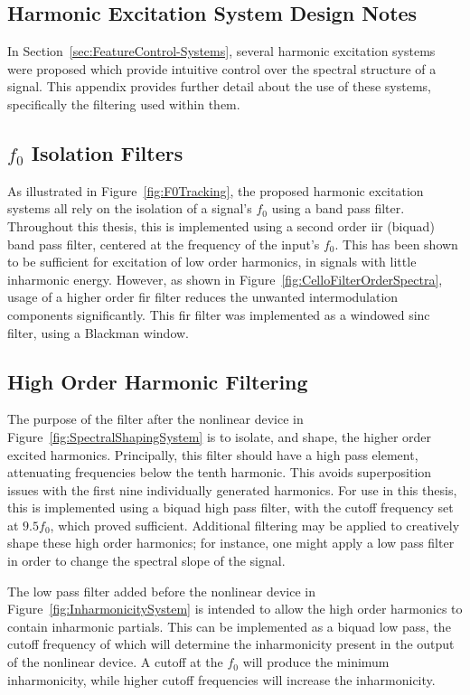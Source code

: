 \begin{appendices}
\chapter{Harmonic Excitation System Design Notes}
\label{app:FilterNotes}
	In Section~\ref{sec:FeatureControl-Systems}, several harmonic excitation systems were proposed which provide
	intuitive control over the spectral structure of a signal. This appendix provides further detail about the use of
	these systems, specifically the filtering used within them.

	\section{$f_{0}$ Isolation Filters}
		As illustrated in Figure~\ref{fig:F0Tracking}, the proposed harmonic excitation systems all rely on the
		isolation of a signal's $f_{0}$ using a band pass filter. Throughout this thesis, this is implemented using
		a second order \acrshort{iir} (biquad) band pass filter, centered at the frequency of the input's $f_{0}$.
		This has been shown to be sufficient for excitation of low order harmonics, in signals with little
		inharmonic energy.  However, as shown in Figure~\ref{fig:CelloFilterOrderSpectra}, usage of a higher order
		\acrshort{fir} filter reduces the unwanted intermodulation components significantly. This \acrshort{fir}
		filter was implemented as a windowed sinc filter, using a Blackman window.

	\section{High Order Harmonic Filtering}
		The purpose of the filter after the nonlinear device in Figure~\ref{fig:SpectralShapingSystem} is to
		isolate, and shape, the higher order excited harmonics. Principally, this filter should have a high pass
		element, attenuating frequencies below the tenth harmonic. This avoids superposition issues with the first
		nine individually generated harmonics. For use in this thesis, this is implemented using a biquad high pass
		filter, with the cutoff frequency set at $9.5f_{0}$, which proved sufficient. Additional filtering may be
		applied to creatively shape these high order harmonics; for instance, one might apply a low pass filter in
		order to change the spectral slope of the signal.

		The low pass filter added before the nonlinear device in Figure~\ref{fig:InharmonicitySystem} is intended to
		allow the high order harmonics to contain inharmonic partials. This can be implemented as a biquad low pass,
		the cutoff frequency of which will determine the inharmonicity present in the output of the nonlinear
		device. A cutoff at the $f_{0}$ will produce the minimum inharmonicity, while higher cutoff frequencies will
		increase the inharmonicity.


\end{appendices}
